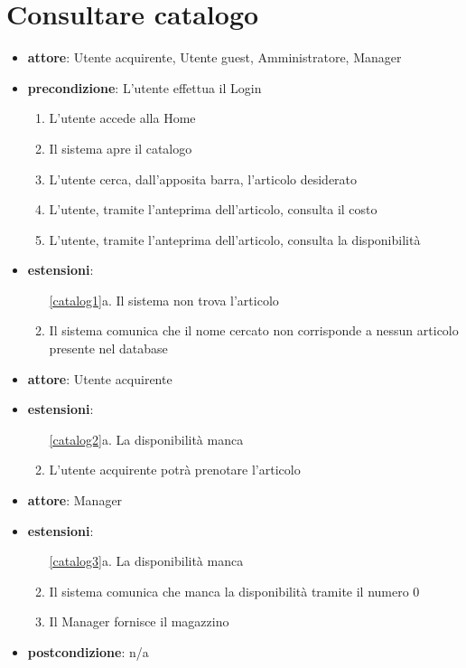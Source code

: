 \section{Consultare catalogo}
\begin{itemize}
    \item \textbf{attore}: Utente acquirente, Utente guest, Amministratore, Manager
	\item \textbf{precondizione}: L’utente effettua il Login

    \begin{enumerate}
        \item L’utente accede alla Home
        \item Il sistema apre il catalogo
        \item L’utente cerca, dall’apposita barra, l’articolo desiderato
        \label{catalog1}
		\item L’utente, tramite l'anteprima dell’articolo, consulta il costo
		\label{catalog2}
		\item L’utente, tramite l'anteprima dell’articolo, consulta la disponibilità
		\label{catalog3}
	\end{enumerate}

	\item \textbf{estensioni}:
	\begin{enumerate}
		\item[\ref{catalog1}a.] Il sistema non trova l’articolo
            
		\item Il sistema comunica che il nome cercato non corrisponde a nessun articolo presente nel database
	\end{enumerate}

    \item \textbf{attore}: Utente acquirente

	\item \textbf{estensioni}:
	\begin{enumerate}
		\item[\ref{catalog2}a.] La disponibilità manca
            
		\item L’utente acquirente potrà prenotare l’articolo
	\end{enumerate}

	\item \textbf{attore}: Manager
	\item \textbf{estensioni}:
        
	\begin{enumerate}
		\item[\ref{catalog3}a.] La disponibilità manca
            
		\item Il sistema comunica che manca la disponibilità tramite il numero 0
        \item Il Manager fornisce il magazzino 
	\end{enumerate}

	\item \textbf{postcondizione}: n/a
\end{itemize}